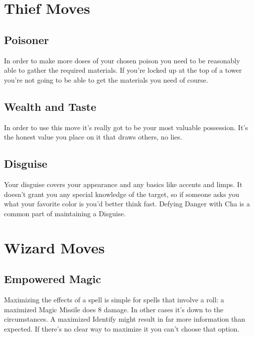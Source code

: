        
\section{Thief Moves}    
       
\subsection{Poisoner}   
       

In order to make more doses of your chosen poison you need to be reasonably able to gather the required materials. If you're locked up at the top of a tower you're not going to be able to get the materials you need of course.

       
\subsection{Wealth and Taste}    
       

In order to use this move it's really got to be your most valuable possession. It's the honest value you place on it that draws others, no lies.

       
\subsection{Disguise}   
       

Your disguise covers your appearance and any basics like accents and limps. It doesn't grant you any special knowledge of the target, so if someone asks you what your favorite color is you'd better think fast. Defying Danger with Cha is a common part of maintaining a Disguise.

       
\section{Wizard Moves}    
       
\subsection{Empowered Magic}    
       

Maximizing the effects of a spell is simple for spells that involve a roll: a maximized Magic Missile does 8 damage. In other cases it's down to the circumstances. A maximized Identify might result in far more information than expected. If there's no clear way to maximize it you can't choose that option.

